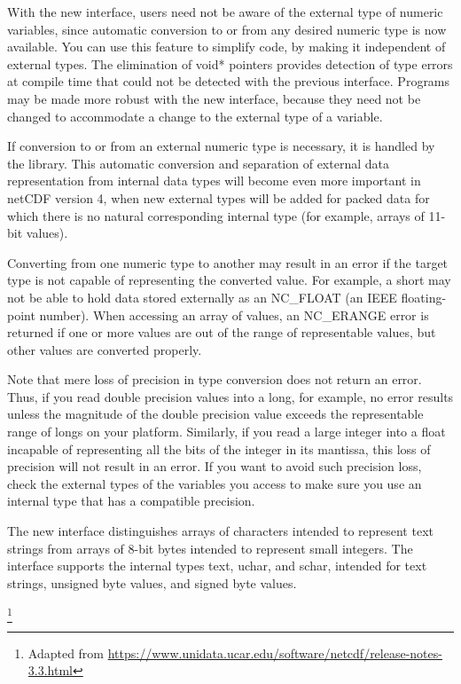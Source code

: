 {\itshape

With the new interface, users need not be aware of the external type of numeric variables, since automatic conversion to or from any desired numeric type is now available. You can use this feature to simplify code, by making it independent of external types. The elimination of void* pointers provides detection of type errors at compile time that could not be detected with the previous interface. Programs may be made more robust with the new interface, because they need not be changed to accommodate a change to the external type of a variable.

If conversion to or from an external numeric type is necessary, it is handled by the library. This automatic conversion and separation of external data representation from internal data types will become even more important in netCDF version 4, when new external types will be added for packed data for which there is no natural corresponding internal type (for example, arrays of 11-bit values).

Converting from one numeric type to another may result in an error if the target type is not capable of representing the converted value. For example, a short may not be able to hold data stored externally as an NC\_FLOAT (an IEEE floating-point number). When accessing an array of values, an NC\_ERANGE error is returned if one or more values are out of the range of representable values, but other values are converted properly.

Note that mere loss of precision in type conversion does not return an error. Thus, if you read double precision values into a long, for example, no error results unless the magnitude of the double precision value exceeds the representable range of longs on your platform. Similarly, if you read a large integer into a float incapable of representing all the bits of the integer in its mantissa, this loss of precision will not result in an error. If you want to avoid such precision loss, check the external types of the variables you access to make sure you use an internal type that has a compatible precision.

The new interface distinguishes arrays of characters intended to represent text strings from arrays of 8-bit bytes intended to represent small integers. The interface supports the internal types text, uchar, and schar, intended for text strings, unsigned byte values, and signed byte values.
}\footnote{Adapted from \url{https://www.unidata.ucar.edu/software/netcdf/release-notes-3.3.html}}

